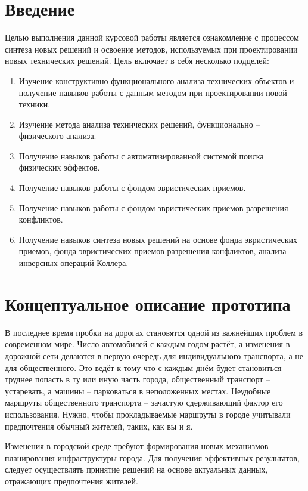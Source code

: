 \chapter{Введение}
Целью выполнения данной курсовой работы является ознакомление с процессом синтеза новых решений и 
освоение методов, используемых при проектировании новых технических решений.
Цель включает в себя несколько подцелей:
\begin{enumerate}
    \item Изучение конструктивно-функционального анализа технических объектов и получение навыков работы 
        с данным методом при проектировании новой техники.
    \item Изучение метода анализа технических решений, функционально -- физического анализа. 
    \item Получение навыков работы с автоматизированной системой поиска физических эффектов.
    \item Получение навыков работы с фондом эвристических приемов.
    \item Получение навыков работы с фондом эвристических приемов разрешения конфликтов.
    \item Получение навыков синтеза новых решений на основе фонда эвристических приемов, фонда 
        эвристических приемов разрешения конфликтов, анализа инверсных операций Коллера.
\end{enumerate}

\chapter{Концептуальное описание прототипа}
В последнее время пробки на дорогах становятся одной из важнейших проблем в современном мире. Число 
автомобилей с каждым годом растёт, а изменения в дорожной сети делаются в первую очередь для 
индивидуального транспорта, а не для общественного. Это ведёт к тому что с каждым днём будет становиться 
труднее попасть в ту или иную часть города, общественный транспорт -- устаревать, а машины -- парковаться 
в неположенных местах. Неудобные маршруты общественного транспорта -- зачастую сдерживающий фактор его 
использования. Нужно, чтобы прокладываемые маршруты в городе учитывали предпочтения обычный жителей, таких, 
как вы и я. 

Изменения в городской среде требуют формирования новых механизмов планирования инфраструктуры города. 
Для получения эффективных результатов, следует осуществлять принятие решений на основе актуальных данных, 
отражающих предпочтения жителей.

